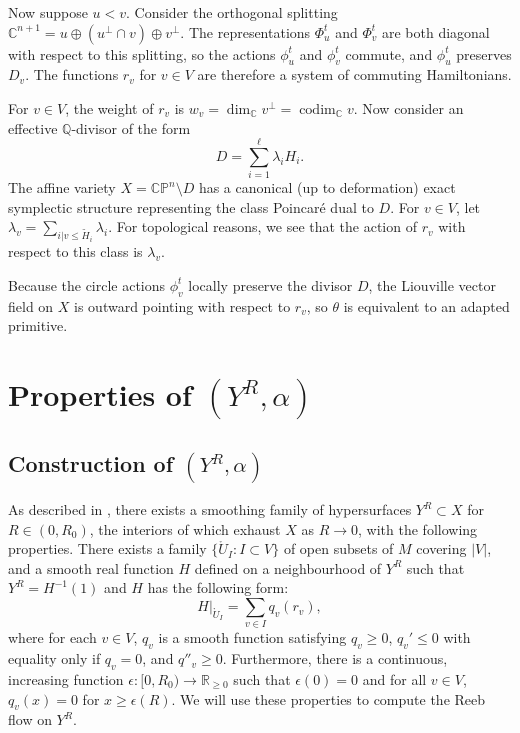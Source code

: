 \documentclass{article}
\numberwithin{equation}{section}
\numberwithin{figure}{section}
\begin{document}
Now suppose $u<v$. Consider the orthogonal splitting $\mathbb{C}^{n+1}=u\oplus (u^\perp\cap v)\oplus v^\perp$. The representations $\Phi_u^t$ and $\Phi_v^t$ are both diagonal with respect to this splitting, so the actions $\phi_u^t$ and $\phi_v^t$ commute, and $\phi_u^t$ preserves $D_v$. The functions $r_v$ for $v\in V$ are therefore a system of commuting Hamiltonians.

For $v\in V$, the weight of $r_v$ is $w_v=\dim_{\mathbb{C}}v^\perp=\operatorname{codim}_{\mathbb{C}}v$. Now consider an effective $\mathbb{Q}$-divisor of the form
\begin{equation}
D=\sum_{i=1}^\ell\lambda_i H_i.
\end{equation}
The affine variety $X=\mathbb{CP}^n\setminus D$ has a canonical (up to deformation) exact symplectic structure representing the class Poincar\'e dual to $D$. For $v\in V$, let $\lambda_v=\sum_{i| v\leq \tilde{H}_i}\lambda_i$. For topological reasons, we see that the action of $r_v$ with respect to this class is $\lambda_v$.

Because the circle actions $\phi_v^t$ locally preserve the divisor $D$, the Liouville vector field on $X$ is outward pointing with respect to $r_v$, so $\theta$ is equivalent to an adapted primitive.

\section{Properties of $(Y^R,\alpha)$}
\subsection{Construction of $(Y^R,\alpha)$}
As described in \cite{Ga}, there exists a smoothing family of hypersurfaces $Y^R\subset X$ for $R\in (0,R_0)$, the interiors of which exhaust $X$ as $R\to 0$, with the following properties. There exists a family $\{\mathring{U}_I:I\subset V\}$ of open subsets of $M$ covering $|V|$, and a smooth real function $H$ defined on a neighbourhood of $Y^R$ such that $Y^R=H^{-1}(1)$ and $H$ has the following form:
\begin{equation}
H|_{\mathring{U}_I}=\sum_{v\in I}q_v(r_v),
\label{H_standard_form}
\end{equation}
where for each $v\in V$, $q_v$ is a smooth function satisfying $q_v\geq 0$, $q_v'\leq 0$ with equality only if $q_v=0$, and $q''_v\geq 0$. Furthermore, there is a continuous, increasing function $\epsilon:[0,R_0)\rightarrow \mathbb{R}_{\geq 0}$ such that $\epsilon(0)=0$ and for all $v\in V$, $q_v(x)=0$ for $x\geq\epsilon(R)$. We will use these properties to compute the Reeb flow on $Y^R$.
\end{document}
